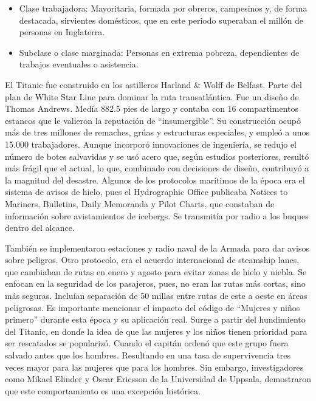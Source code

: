 \documentclass[sjournal]{IEEEtran}
\begin{document}
\begin{itemize}
    \item Clase trabajadora: Mayoritaria, formada por obreros, campesinos y, de forma destacada, sirvientes domésticos, que en este periodo superaban el millón de personas en Inglaterra.
    \item Subclase o clase marginada: Personas en extrema pobreza, dependientes de trabajos eventuales o asistencia.
\end{itemize}

El Titanic fue construido en los astilleros Harland \& Wolff de Belfast. Parte del plan de White Star Line para dominar la ruta transatlántica. Fue un diseño de Thomas Andrews. Medía 882.5 pies de largo y contaba con 16 compartimentos estancos que le valieron la reputación de “insumergible”. Su construcción ocupó más de tres millones de remaches, grúas y estructuras especiales, y empleó a unos 15.000 trabajadores. Aunque incorporó innovaciones de ingeniería, se redujo el número de botes salvavidas y se usó acero que, según estudios posteriores, resultó más frágil que el actual, lo que, combinado con decisiones de diseño, contribuyó a la magnitud del desastre. Algunos de los protocolos marítimos de la época era el sistema de avisos de hielo, pues el Hydrographic Office publicaba Notices to Mariners, Bulletins, Daily Memoranda y Pilot Charts, que constaban de información sobre avistamientos de icebergs. Se transmitía por radio a los buques dentro del alcance.   

También se implementaron estaciones y radio naval de la Armada para dar avisos sobre peligros. Otro protocolo, era el acuerdo internacional de steamship lanes, que cambiaban de rutas en enero y agosto para evitar zonas de hielo y niebla. Se enfocan en la seguridad de los pasajeros, pues, no eran las rutas más cortas, sino más seguras. Incluían separación de 50 millas entre rutas de este a oeste en áreas peligrosas. Es importante mencionar el impacto del código de “Mujeres y niños primero” durante esta época y su aplicación real. Surge a partir del hundimiento del Titanic, en donde la idea de que las mujeres y los niños tienen prioridad para ser rescatados se popularizó. Cuando el capitán ordenó que este grupo fuera salvado antes que los hombres. Resultando en una tasa de supervivencia tres veces mayor para las mujeres que para los hombres. Sin embargo, investigadores como Mikael Elinder y Oscar Ericsson de la Universidad de Uppsala, demostraron que este comportamiento es una excepción histórica. 
\end{document}
